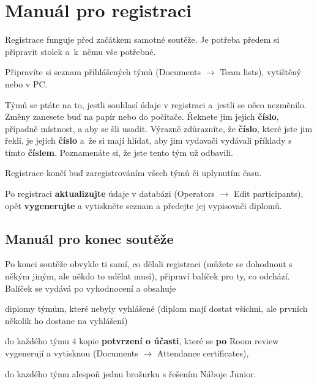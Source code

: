 \documentclass[vyfuk,\classoptions]{fksempty}
\begin{document}
\section{Manuál pro registraci}

Registrace funguje před začátkem samotné soutěže. Je potřeba předem
si připravit stolek a~k~němu vše potřebné. 

\medskip

Připravíte si seznam přihlášených týmů (Documents $\rightarrow$ Team lists),
vytištěný nebo v PC.

\medskip
 
Týmů se ptáte na to, jestli souhlasí údaje v registraci a~jestli se něco nezměnilo.
Změny zanesete buď na papír nebo do počítače. Řeknete jim jejich {\bf číslo},
případně místnost, a aby se šli usadit. Výrazně zdůrazníte,
že \textbf{číslo}, které jste jim řekli, je jejich \textbf{číslo} a~že si mají
hlídat, aby jim vydavači vydávali příklady s tímto \textbf{číslem}.
Poznamenáte si, že jste tento tým už odbavili.

\medskip

Registrace končí buď zaregistrováním všech týmů či uplynutím času.

\medskip

Po registraci {\bf aktualizujte} údaje v databázi (Operators $\rightarrow$ Edit participants),
opět {\bf vygenerujte} a vytiskněte seznam a předejte jej vypisovači diplomů.

\subsection{Manuál pro konec soutěže}
Po konci soutěže obvykle ti samí, co dělali registraci (můžete se dohodnout s někým
jiným, ale někdo to udělat musí), připraví balíček pro ty, co odchází. Balíček se vydává
po vyhodnocení a obsahuje
\begin{compactitem}
	\item diplomy týmům, které nebyly vyhlášené	(diplom mají dostat všichni, ale
prvních několik ho dostane na vyhlášení)
	\item do každého týmu 4 kopie \textbf{potvrzení o účasti}, které se
\textbf{po} Room review vygenerují a vytisknou (Documents $\rightarrow$ Attendance certificates),
	\item do kazdého týmu alespoň jednu brožurku s řešením Náboje Junior.
\end{compactitem}
\end{document}
